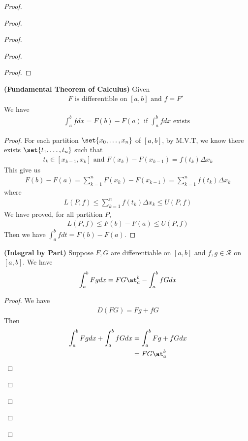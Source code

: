 \documentclass{report}
\begin{document}
\begin{proof}
\begin{proof}
\begin{proof}
\begin{proof}
\begin{proof}
\end{proof}
\begin{theorem}
\label{7.4.2}
\textbf{(Fundamental Theorem of Calculus)} Given 
\begin{align*}
F\text{ is differentible on $[a,b]$ and $f=F'$ }
\end{align*}
We have 
\begin{align*}
\int_a^b fdx= F(b)-F(a)\text{ if $\int_a^b fdx$ exists }
\end{align*}
\end{theorem}
\begin{proof}
For each partition $\set{x_0,\dots ,x_n}$ of $[a,b]$, by M.V.T, we know there exists $\set{t_1,\dots, t_n}$ such that 
\begin{align*}
t_k \in [x_{k-1},x_k]\text{ and } F(x_k)-F(x_{k-1})=f(t_k)\Delta x_k
\end{align*}
This give us 
\begin{align*}
F(b)-F(a)=\sum_{k=1}^n F(x_k)-F(x_{k-1}) =\sum_{k=1}^n f(t_k)\Delta x_k 
\end{align*}
where 
\begin{align*}
L(P,f)\leq \sum_{k=1}^n f(t_k)\Delta x_k \leq U(P,f)
\end{align*}
We have proved, for all partition $P$, 
 \begin{align*}
L(P,f)\leq F(b)-F(a) \leq U(P,f)
\end{align*}
Then we have $\int_a^b fdt =F(b)-F(a)$. 
\end{proof}
\begin{theorem}
\label{7.4.3}
\textbf{(Integral by Part)} Suppose $F,G$ are differentiable on $[a,b]$ and  $f,g \in \mathscr{R}$ on $[a,b]$. We have 
\begin{align*}
\int_a^b Fgdx=FG\at_{a}^b-\int_a^b fGdx
\end{align*}
\end{theorem}
\begin{proof}
We have 
\begin{align*}
D(FG)=Fg+fG
\end{align*}
Then 
\begin{align*}
\int_a^b Fgdx+\int_a^b fGdx&= \int_a^b Fg+fG dx\\
&=FG\at_{a}^b
\end{align*}
\end{proof}








\end{proof}
\end{proof}
\end{proof}
\end{proof}
\end{document}
